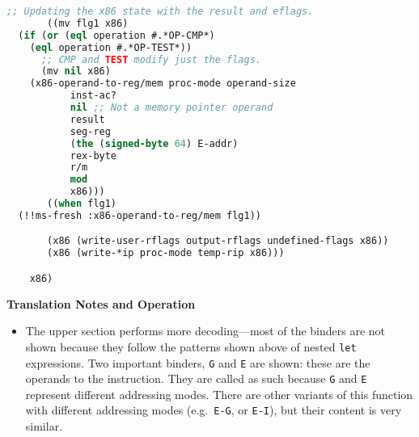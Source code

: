 \documentclass[a4paper]{article}
\begin{document}
\begin{tcolorbox}[breakable]
\begin{parcolumns}{2}
{\begin{lstlisting}[language=lisp]
       ;; Updating the x86 state with the result and eflags.
       ((mv flg1 x86)
  (if (or (eql operation #.*OP-CMP*)
    (eql operation #.*OP-TEST*))
      ;; CMP and TEST modify just the flags.
      (mv nil x86)
    (x86-operand-to-reg/mem proc-mode operand-size
           inst-ac?
           nil ;; Not a memory pointer operand
           result
           seg-reg
           (the (signed-byte 64) E-addr)
           rex-byte
           r/m
           mod
           x86)))
       ((when flg1)
  (!!ms-fresh :x86-operand-to-reg/mem flg1))

       (x86 (write-user-rflags output-rflags undefined-flags x86))
       (x86 (write-*ip proc-mode temp-rip x86)))

    x86)
\end{lstlisting}
}
\colplacechunks

\end{parcolumns}

\textbf{Translation Notes and Operation}

\begin{itemize}
  \item The upper section performs more decoding---most of the binders are not shown because they follow the patterns shown above of nested \texttt{let} expressions.  Two important binders, \texttt{G} and \texttt{E} are shown: these are the operands to the instruction.  They are called as such because \texttt{G} and \texttt{E} represent different addressing modes.  There are other variants of this function with different addressing modes (e.g.~\texttt{E-G}, or \texttt{E-I}), but their content is very similar.


\end{itemize}
\end{tcolorbox}
\end{document}
